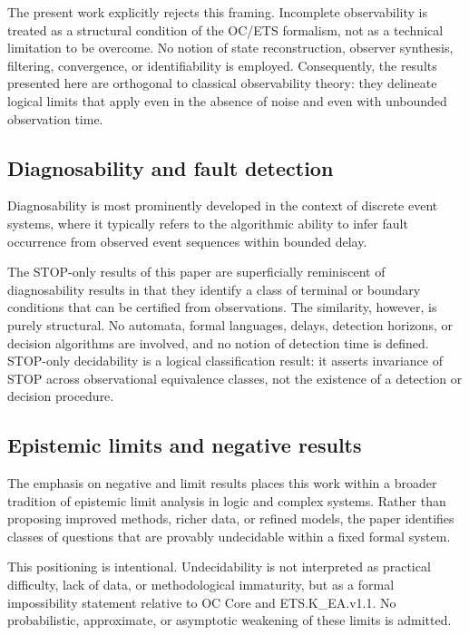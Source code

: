 The present work explicitly rejects this framing. Incomplete
observability is treated as a structural condition of the OC/ETS
formalism, not as a technical limitation to be overcome. No notion of
state reconstruction, observer synthesis, filtering, convergence, or
identifiability is employed. Consequently, the results presented here
are orthogonal to classical observability theory: they delineate
logical limits that apply even in the absence of noise and even with
unbounded observation time.
\cite{milner1980_ccs,milner1989_communication_concurrency,van_glabbeek2001_ltbts1}

\subsection{Diagnosability and fault detection}

Diagnosability is most prominently developed in the context of discrete
event systems, where it typically refers to the algorithmic ability to
infer fault occurrence from observed event sequences within bounded
delay.

The STOP-only results of this paper are superficially reminiscent of
diagnosability results in that they identify a class of terminal or
boundary conditions that can be certified from observations. The
similarity, however, is purely structural. No automata, formal
languages, delays, detection horizons, or decision algorithms are
involved, and no notion of detection time is defined. STOP-only
decidability is a logical classification result: it asserts invariance
of STOP across observational equivalence classes, not the existence of
a detection or decision procedure.
\cite{sampath1995_diagnosability_des}

\subsection{Epistemic limits and negative results}

The emphasis on negative and limit results places this work within a
broader tradition of epistemic limit analysis in logic and complex
systems. Rather than proposing improved methods, richer data, or
refined models, the paper identifies classes of questions that are
provably undecidable within a fixed formal system.

This positioning is intentional. Undecidability is not interpreted as
practical difficulty, lack of data, or methodological immaturity, but
as a formal impossibility statement relative to OC Core and
ETS.K\_EA.v1.1. No probabilistic, approximate, or asymptotic weakening
of these limits is admitted.
\cite{hodges1993_model_theory}

